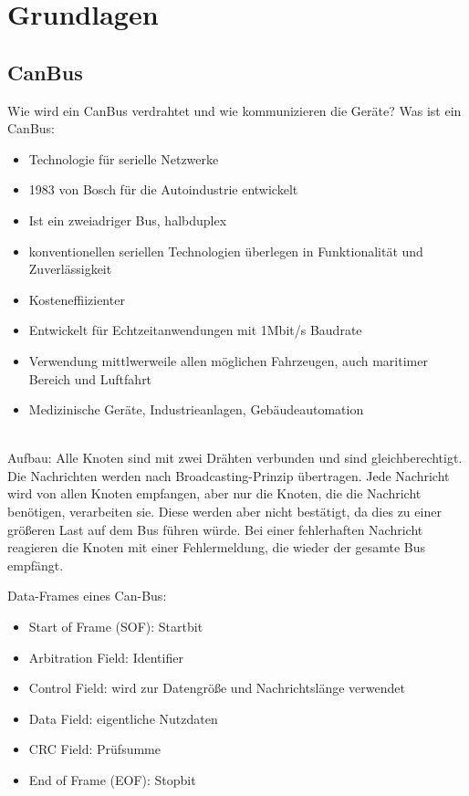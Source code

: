 \chapter{Grundlagen}


\section{CanBus}
Wie wird ein CanBus verdrahtet und wie kommunizieren die Geräte?
Was ist ein CanBus:
\begin{itemize}
    \item Technologie für serielle Netzwerke
    \item 1983 von Bosch für die Autoindustrie entwickelt
    \item Ist ein zweiadriger Bus, halbduplex
    \item konventionellen seriellen Technologien überlegen in Funktionalität und Zuverlässigkeit
    \item Kosteneffiizienter
    \item Entwickelt für Echtzeitanwendungen mit 1Mbit/s Baudrate
    \item Verwendung mittlwerweile allen möglichen Fahrzeugen, auch maritimer Bereich und Luftfahrt
    \item Medizinische Geräte, Industrieanlagen, Gebäudeautomation
\end{itemize}

\cite[Seiten 2-10]{Voss2008}
\\
Aufbau:
Alle Knoten sind mit zwei Drähten verbunden und sind gleichberechtigt.
\cite[Seite 132]{Voss2008}
\\
Die Nachrichten werden nach Broadcasting-Prinzip übertragen. Jede Nachricht wird von allen Knoten empfangen, 
aber nur die Knoten, die die Nachricht benötigen, verarbeiten sie. Diese werden aber nicht bestätigt,
da dies zu einer größeren Last auf dem Bus führen würde. Bei einer fehlerhaften Nachricht reagieren
die Knoten mit einer Fehlermeldung, die wieder der gesamte Bus empfängt.
\cite[Seite 80]{Voss2008}

Data-Frames eines Can-Bus:
\begin{itemize}
    \item Start of Frame (SOF): Startbit
    \item Arbitration Field: Identifier
    \item Control Field: wird zur Datengröße und Nachrichtslänge verwendet
    \item Data Field: eigentliche Nutzdaten
    \item CRC Field: Prüfsumme
    \item End of Frame (EOF): Stopbit
\end{itemize}
\cite[Seite 36]{Voss2008}

